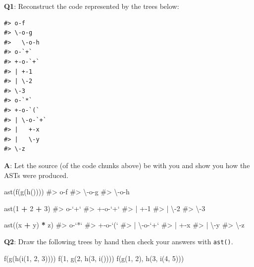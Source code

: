 \documentclass[
]{krantz}
\makeatletter
\newenvironment{Shaded}{\begin{snugshade}}{\end{snugshade}}
\newcommand{\CommentTok}[1]{\textcolor[rgb]{0.56,0.35,0.01}{\textit{#1}}}
\newcommand{\DecValTok}[1]{\textcolor[rgb]{0.00,0.00,0.81}{#1}}
\newcommand{\KeywordTok}[1]{\textcolor[rgb]{0.13,0.29,0.53}{\textbf{#1}}}
\newcommand{\NormalTok}[1]{#1}
\newcommand{\OperatorTok}[1]{\textcolor[rgb]{0.81,0.36,0.00}{\textbf{#1}}}
\newcommand{\StringTok}[1]{\textcolor[rgb]{0.31,0.60,0.02}{#1}}
\newenvironment{kframe}{%
\medskip{}
\setlength{\fboxsep}{.8em}
 \def\at@end@of@kframe{}%
 \ifinner\ifhmode%
  \def\at@end@of@kframe{\end{minipage}}%
  \begin{minipage}{\columnwidth}%
 \fi\fi%
 \def\FrameCommand##1{\hskip\@totalleftmargin \hskip-\fboxsep
 \colorbox{shadecolor}{##1}\hskip-\fboxsep
     \hskip-\linewidth \hskip-\@totalleftmargin \hskip\columnwidth}%
 \MakeFramed {\advance\hsize-\width
   \@totalleftmargin\z@ \linewidth\hsize
   \@setminipage}}%
 {\par\unskip\endMakeFramed%
 \at@end@of@kframe}
\renewenvironment{Shaded}{\begin{kframe}}{\end{kframe}}
\renewcommand{\KeywordTok} [1]{\textcolor[rgb]{0.00,0.44,0.13}{{#1}}}
\renewcommand{\DecValTok}  [1]{\textcolor[rgb]{0.25,0.63,0.44}{{#1}}}
\renewcommand{\StringTok}  [1]{\textcolor[rgb]{0.25,0.44,0.63}{{#1}}}
\renewcommand{\CommentTok} [1]{\textcolor[rgb]{0.38,0.63,0.69}{{#1}}}
\renewcommand{\NormalTok}  [1]{{#1}}
\makeatother
\begin{document}
\textbf{{Q1}}: Reconstruct the code represented by the trees below:

\begin{verbatim}
#> o-f 
#> \-o-g 
#>   \-o-h
#> o-`+` 
#> +-o-`+` 
#> | +-1 
#> | \-2 
#> \-3
#> o-`*` 
#> +-o-`(` 
#> | \-o-`+` 
#> |   +-x 
#> |   \-y 
#> \-z
\end{verbatim}

\textbf{{A}}: Let the source (of the code chunks above) be with you and show you how the ASTs were produced.

\begin{Shaded}
\begin{Highlighting}[]
\KeywordTok{ast}\NormalTok{(}\KeywordTok{f}\NormalTok{(}\KeywordTok{g}\NormalTok{(}\KeywordTok{h}\NormalTok{())))}
\CommentTok{#> o-f }
\CommentTok{#> \textbackslash{}-o-g }
\CommentTok{#>   \textbackslash{}-o-h}

\KeywordTok{ast}\NormalTok{(}\DecValTok{1} \OperatorTok{+}\StringTok{ }\DecValTok{2} \OperatorTok{+}\StringTok{ }\DecValTok{3}\NormalTok{)}
\CommentTok{#> o-`+` }
\CommentTok{#> +-o-`+` }
\CommentTok{#> | +-1 }
\CommentTok{#> | \textbackslash{}-2 }
\CommentTok{#> \textbackslash{}-3}

\KeywordTok{ast}\NormalTok{((x }\OperatorTok{+}\StringTok{ }\NormalTok{y) }\OperatorTok{*}\StringTok{ }\NormalTok{z)}
\CommentTok{#> o-`*` }
\CommentTok{#> +-o-`(` }
\CommentTok{#> | \textbackslash{}-o-`+` }
\CommentTok{#> |   +-x }
\CommentTok{#> |   \textbackslash{}-y }
\CommentTok{#> \textbackslash{}-z}
\end{Highlighting}
\end{Shaded}

\textbf{{Q2}}: Draw the following trees by hand then check your answers with \texttt{ast()}.

\begin{Shaded}
\begin{Highlighting}[]
\KeywordTok{f}\NormalTok{(}\KeywordTok{g}\NormalTok{(}\KeywordTok{h}\NormalTok{(}\KeywordTok{i}\NormalTok{(}\DecValTok{1}\NormalTok{, }\DecValTok{2}\NormalTok{, }\DecValTok{3}\NormalTok{))))}
\KeywordTok{f}\NormalTok{(}\DecValTok{1}\NormalTok{, }\KeywordTok{g}\NormalTok{(}\DecValTok{2}\NormalTok{, }\KeywordTok{h}\NormalTok{(}\DecValTok{3}\NormalTok{, }\KeywordTok{i}\NormalTok{())))}
\KeywordTok{f}\NormalTok{(}\KeywordTok{g}\NormalTok{(}\DecValTok{1}\NormalTok{, }\DecValTok{2}\NormalTok{), }\KeywordTok{h}\NormalTok{(}\DecValTok{3}\NormalTok{, }\KeywordTok{i}\NormalTok{(}\DecValTok{4}\NormalTok{, }\DecValTok{5}\NormalTok{)))}
\end{Highlighting}
\end{Shaded}
\end{document}
